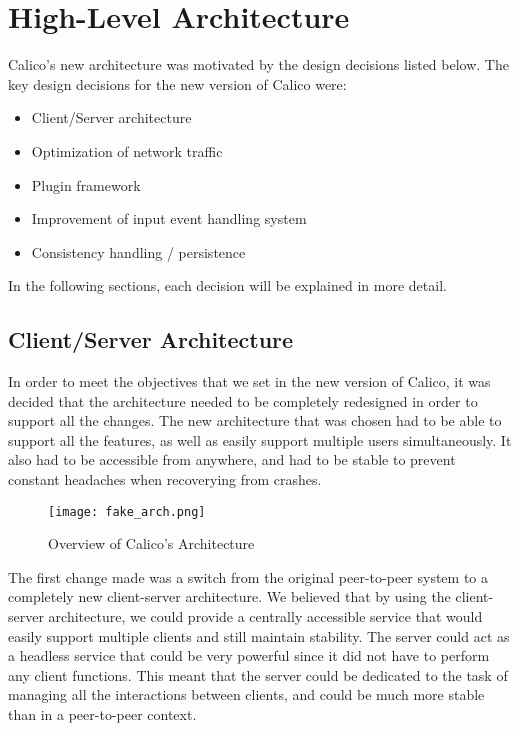 \chapter{High-Level Architecture}

Calico's new architecture was motivated by the design decisions listed below. The key design decisions for the new version of Calico were:

\begin{itemize}\itemsep1pt
  \item Client/Server architecture
  \item Optimization of network traffic
  \item Plugin framework
  \item Improvement of input event handling system
  \item Consistency handling / persistence
\end{itemize}

In the following sections, each decision will be explained in more detail.



\section{Client/Server Architecture}


In order to meet the objectives that we set in the new version of Calico, it was decided that the architecture needed to be completely redesigned in order to support all the changes. The new architecture that was chosen had to be able to support all the features, as well as easily support multiple users simultaneously. It also had to be accessible from anywhere, and had to be stable to prevent constant headaches when recoverying from crashes.

\begin{figure}[h]
\centering
\texttt{[image: fake\_arch.png]}
\caption{Overview of Calico's Architecture}
\label{fig:calico_arch}
\end{figure}

The first change made was a switch from the original peer-to-peer system to a completely new client-server architecture. We believed that by using the client-server architecture, we could provide a centrally accessible service that would easily support multiple clients and still maintain stability. The server could act as a headless service that could be very powerful since it did not have to perform any client functions. This meant that the server could be dedicated to the task of managing all the interactions between clients, and could be much more stable than in a peer-to-peer context.

